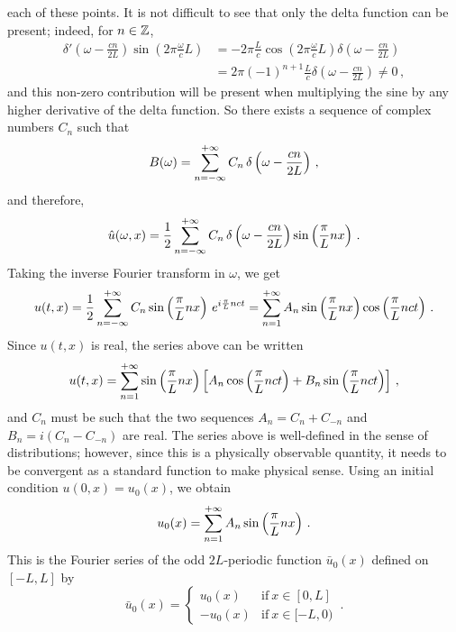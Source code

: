 each of these points. It is not difficult to see that only the delta function can be
present; indeed, for $n\in\mathbb{Z}$,
\begin{align}
  \delta'\left(\omega-\frac{cn}{2L}\right)\sin\left(2\pi\frac{\omega}{c}L\right)
   & =-2\pi\frac{L}{c}\cos\left(2\pi\frac{\omega}{c}L\right)
  \delta\left(\omega-\frac{cn}{2L}\right)                                        \\
   & =2\pi (-1)^{n+1}\frac{L}{c}\delta\left(\omega-\frac{cn}{2L}\right)\neq 0\,,
\end{align}
and this non-zero contribution will be present when multiplying the sine by any higher
derivative of the delta function. So there exists a sequence of complex numbers $C_n$ such
that
\begin{equation}
  B(\omega)=\sum_{n=-\infty}^{+\infty}C_n\,\delta\left(\omega-\frac{cn}{2L}\right)\,,
\end{equation}
and therefore,
\begin{equation}
  \hat{u}(\omega,x)=\frac12\sum_{n=-\infty}^{+\infty}C_n\,\delta\left(\omega-\frac{cn}{2L}\right)
  \sin\left(\frac{\pi}{L}nx\right)\,.
\end{equation}
Taking the inverse Fourier transform in $\omega$, we get
\begin{equation}
  u(t,x)=\frac12\sum_{n=-\infty}^{+\infty}C_n\sin\left(\frac{\pi}{L}nx\right)\,e^{i\frac{\pi}{L}nct}=
  \sum_{n=1}^{+\infty}A_n\sin\left(\frac{\pi}{L}nx\right)\cos\left(\frac{\pi}{L}nct\right)\,.
\end{equation}
Since $u(t,x)$ is real, the series above can be written
\begin{equation}
  u(t,x)=\sum_{n=1}^{+\infty}\sin\left(\frac{\pi}{L}nx\right)\left[
    A_n\cos\left(\frac{\pi}{L}nct\right)+B_n\sin\left(\frac{\pi}{L}nct\right)\right]\,,
\end{equation}
and $C_n$ must be such that the two sequences $A_n=C_n+C_{-n}$ and $B_n=i(C_{n}-C_{-n})$
are real. The series above is well-defined in the sense of distributions; however, since
this is a physically observable quantity, it needs to be convergent as a standard function
to make physical sense. Using an initial condition $u(0,x)=u_0(x)$, we obtain
\begin{equation}
  u_0(x)=\sum_{n=1}^{+\infty}A_n\sin\left(\frac{\pi}{L}nx\right)\,.
  \label{eq:u0-fourier}
\end{equation}
This is the Fourier series of the odd $2L$-periodic function $\bar{u}_0(x)$ defined on
$[-L,L]$ by
\begin{equation}
  \bar{u}_0(x)=
  \begin{cases}
    u_0(x)  & \text{if}~x\in[0,L]  \\
    -u_0(x) & \text{if}~x\in[-L,0)
  \end{cases}
  \,.
\end{equation}
